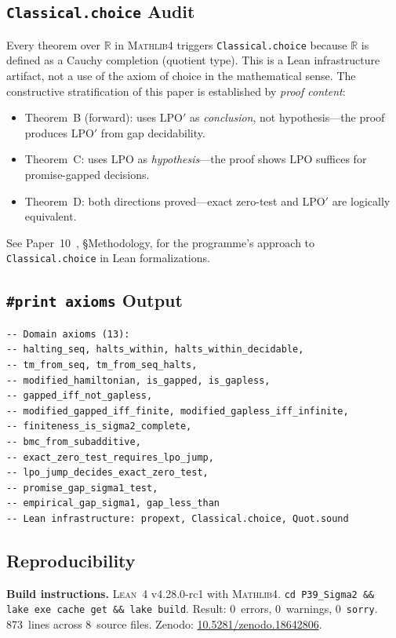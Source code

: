 \documentclass[11pt,a4paper]{article}
\theoremstyle{plain}
\theoremstyle{definition}
\newcommand{\RR}{\mathbb{R}}
\newcommand{\LPO}{\ensuremath{\mathrm{LPO}}}
\newcommand{\LPOj}{\ensuremath{\mathrm{LPO'}}}
\newcommand{\Lean}{\textsc{Lean~4}}
\newcommand{\Mathlib}{\textsc{Mathlib4}}
\begin{document}
\subsection{\texttt{Classical.choice} Audit}

Every theorem over $\RR$ in \Mathlib{} triggers \texttt{Classical.choice}
because $\RR$ is defined as a Cauchy completion (quotient type).
This is a Lean infrastructure artifact, not a use of the axiom of
choice in the mathematical sense.  The constructive stratification
of this paper is established by \emph{proof content}:
\begin{itemize}[nosep]
\item Theorem~B (forward): uses $\LPOj$ as \emph{conclusion},
  not hypothesis---the proof produces $\LPOj$ from gap decidability.
\item Theorem~C: uses $\LPO$ as \emph{hypothesis}---the proof
  shows $\LPO$ suffices for promise-gapped decisions.
\item Theorem~D: both directions proved---exact zero-test and
  $\LPOj$ are logically equivalent.
\end{itemize}
See Paper~10~\cite{Lee26P10}, \S Methodology, for the programme's
approach to \texttt{Classical.choice} in Lean formalizations.

\subsection{\texttt{\#print axioms} Output}

\begin{lstlisting}[caption={\texttt{\#print axioms sigma2\_master} (abridged)}]
-- Domain axioms (13):
-- halting_seq, halts_within, halts_within_decidable,
-- tm_from_seq, tm_from_seq_halts,
-- modified_hamiltonian, is_gapped, is_gapless,
-- gapped_iff_not_gapless,
-- modified_gapped_iff_finite, modified_gapless_iff_infinite,
-- finiteness_is_sigma2_complete,
-- bmc_from_subadditive,
-- exact_zero_test_requires_lpo_jump,
-- lpo_jump_decides_exact_zero_test,
-- promise_gap_sigma1_test,
-- empirical_gap_sigma1, gap_less_than
-- Lean infrastructure: propext, Classical.choice, Quot.sound
\end{lstlisting}

\subsection{Reproducibility}

\begin{mdframed}[linewidth=1pt, linecolor=black!40,
  backgroundcolor=blue!3, roundcorner=5pt]
\textbf{Build instructions.}
\Lean{} v4.28.0-rc1 with \Mathlib{}.
\texttt{cd P39\_Sigma2 \&\& lake exe cache get \&\& lake build}.
Result: 0~errors, 0~warnings, 0~\texttt{sorry}.
873~lines across 8~source files.
Zenodo: \href{https://doi.org/10.5281/zenodo.18642806}{10.5281/zenodo.18642806}.
\end{mdframed}
\end{document}
